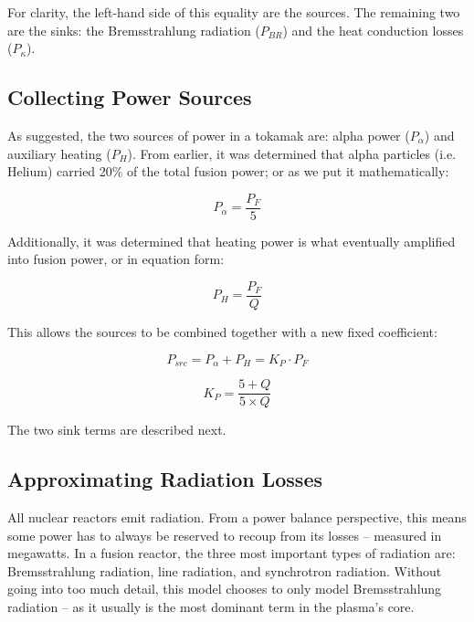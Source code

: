 For clarity, the left-hand side of this equality are the sources. The remaining two are the sinks: the Bremsstrahlung radiation ($P_{BR}$) and the heat conduction losses ($P_\kappa$).

\subsection{Collecting Power Sources}

As suggested, the two sources of power in a tokamak are: alpha power ($P_\alpha$) and auxiliary heating ($P_H$). From earlier, it was determined that alpha particles (i.e. Helium) carried 20\% of the total fusion power; or as we put it mathematically:

\begin{equation}
	\label{eq:palpha}
	P_\alpha = \frac{P_F}{5}
\end{equation}

Additionally, it was determined that heating power is what eventually amplified into fusion power, or in equation form:

\begin{equation}
	\label{eq:ph}
	P_H = \frac{P_F}{Q}
\end{equation}

This allows the sources to be combined together with a new fixed coefficient:

\begin{equation}
	P_{src} = P_\alpha + P_H = K_P \cdot P_F
\end{equation}

\begin{equation}
	K_P = \frac{5 + Q}{5 \times Q}
\end{equation}

The two sink terms are described next.

\subsection{Approximating Radiation Losses}

All nuclear reactors emit radiation. From a power balance perspective, this means some power has to always be reserved to recoup from its losses -- measured in megawatts. In a fusion reactor, the three most important types of radiation are: Bremsstrahlung radiation, line radiation, and synchrotron radiation. Without going into too much detail, this model chooses to only model Bremsstrahlung radiation -- as it usually is the most dominant term in the plasma's core.

